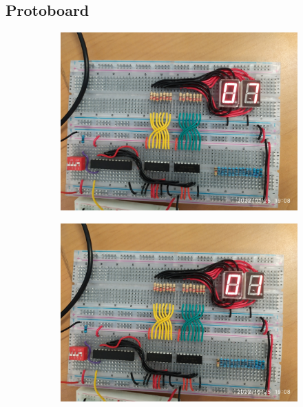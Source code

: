\documentclass[12pt, oneside, openany]{article}
\begin{document}
\subsection{Protoboard}
\begin{figure}[h!]
    \centering

    \begin{subfigure}[tl]{0.45\textwidth}
        \centering
        \includegraphics[width=\linewidth]{figs/IMG_20221025_190801.jpg}
    \end{subfigure}
    \begin{subfigure}[tr]{0.45\textwidth}
        \centering
        \includegraphics[width=\linewidth]{figs/IMG_20221025_190803.jpg}
    \end{subfigure}

\end{figure}
\end{document}
